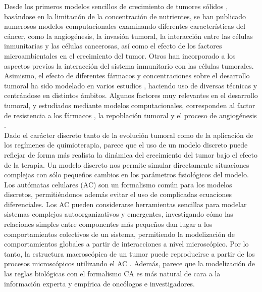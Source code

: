 Desde los primeros modelos sencillos de crecimiento de tumores sólidos \cite{Burton1966}, basándose en la limitación de la concentración de nutrientes, se han publicado numerosos modelos computacionales \cite{Anderson1998, Bellouquid2012, Smolle1993, Sabzpoushan2018, Robertson2015} examinando diferentes características del cáncer, como la angiogénesis, la invasión tumoral, la interacción entre las células inmunitarias y las células cancerosas, así como el efecto de los factores microambientales en el crecimiento del tumor. Otros \cite{Byrne2006, Materi2007, Kuznetsov1994, Eikenberry2009, Eftimie2011, Rejniak2011, Marcu2012} han incorporado a los aspectos previos la interacción del sistema inmunitario con las células tumorales. Asimismo, el efecto de diferentes fármacos y concentraciones sobre el desarrollo tumoral ha sido modelado en varios estudios \cite{Aroesty1973, Simeoni2004, DePillis2007, DePillis2008}, haciendo uso de diversas técnicas y centrándose en distintos ámbitos. Algunos factores muy relevantes  en el desarrollo tumoral, y estudiados mediante modelos computacionales, corresponden al factor de resistencia a los fármacos \cite{Marcu2005}, la repoblación tumoral \cite{Marcu2010} y el proceso de angiogénesis \cite{Wang2013}.\\

Dado el carácter discreto tanto de la evolución tumoral como de la aplicación de los regímenes de quimioterapia, parece que el uso de un modelo discreto puede reflejar de forma más realista la dinámica del crecimiento del tumor bajo el efecto de la terapia. Un modelo discreto nos permite simular directamente situaciones complejas con sólo pequeños cambios en los parámetros fisiológicos del modelo. Los autómatas celulares (AC) son un formalismo común para los modelos discretos, permitiéndonos además evitar el uso de complicadas ecuaciones diferenciales. Los AC pueden considerarse herramientas sencillas para modelar sistemas complejos autoorganizativos y emergentes, investigando cómo las relaciones simples entre componentes más pequeños dan lugar a los comportamientos colectivos de un sistema, permitiendo la modelización de comportamientos globales a partir de interacciones a nivel microscópico. Por lo tanto, la estructura macroscópica de un tumor puede reproducirse a partir de los procesos microscópicos utilizando el AC \cite{Mallet2006, Schmitz2002, Reis2009}. Además, parece que la modelización de las reglas biológicas con el formalismo CA es más natural de cara a la información experta y empírica de oncólogos e investigadores.\\

